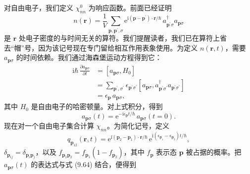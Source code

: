 对自由电子，我们定义 $\chi_{nn}^{0}$ 为响应函数。前面已经证明
\begin{equation*}
n(\mathbf{r})=\frac{1}{V}\sum_{\mathbf{p},\mathbf{p}^{\prime},\sigma}\mathrm{e}^{\mathrm{i}(\mathbf{p}-\mathbf{p}^{\prime})\cdot\mathbf{r}/\hbar}\,a_{\mathbf{p}^{\prime}\sigma}^{\dagger}a_{\mathbf{p}\sigma}\tag{9.64}
\end{equation*}
是 $\mathbf{r}$ 处电子密度的与时间无关的算符。我们提醒读者，我们已在算符上省去“帽”号，因为该记号现在专门留给相互作用表象使用。为定义 $n(\mathbf{r},t)$，需要 $a_{\mathbf{p}\sigma}$ 的时间依赖。我们通过海森堡运动方程得到它：
\begin{equation*}
\begin{aligned}
\mathrm{i}\hbar\,\frac{\partial a_{\mathbf{p}\sigma}}{\partial t}&=[a_{\mathbf{p}\sigma},H_0]\\
&=\sum_{\mathbf{p}^{\prime},\sigma^{\prime}}\epsilon_{\mathbf{p}^{\prime}\sigma^{\prime}}\left[a_{\mathbf{p}\sigma},a_{\mathbf{p}^{\prime}\sigma^{\prime}}^{\dagger}a_{\mathbf{p}^{\prime}\sigma^{\prime}}\right]\\
&=\epsilon_{\mathbf{p}}\,a_{\mathbf{p}\sigma},
\end{aligned}\tag{9.65}
\end{equation*}
其中 $H_0$ 是自由电子的哈密顿量。对上式积分，得到
\begin{equation*}
a_{\mathbf{p}\sigma}(t)=\mathrm{e}^{-\mathrm{i}\epsilon_{\mathbf{p}}t/\hbar}\,a_{\mathbf{p}\sigma}(t=0).\tag{9.66}
\end{equation*}
现在对一个自由电子集合计算 $\chi_{nn}$。为简化记号，定义
\begin{equation*}
q_{\mathbf{p}_{12}}(\mathbf{r},t)=\mathrm{e}^{\mathrm{i}(\mathbf{p}_2-\mathbf{p}_1)\cdot\mathbf{r}/\hbar}\,\mathrm{e}^{\mathrm{i}(\epsilon_{\mathbf{p}_1}-\epsilon_{\mathbf{p}_2})t/\hbar},\tag{9.67}
\end{equation*}
$\delta_{\mathbf{p}_{ij}}=\delta_{\mathbf{p}_i\mathbf{p}_j}$，以及 $f_{\mathbf{p}_1\mathbf{p}_2}=f_{\mathbf{p}_1}(1-f_{\mathbf{p}_2})$，其中 $f_{\mathbf{p}}$ 表示态 $\mathbf{p}$ 被占据的概率。把 $a_{\mathbf{p}\sigma}(t)$ 的表达式与式 (9.64) 结合，便得到
